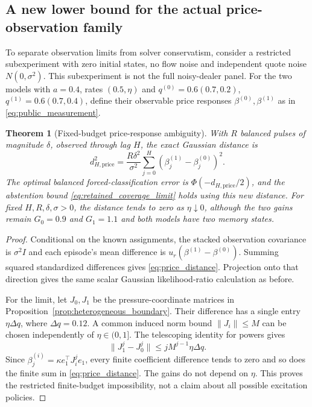 \documentclass[11pt,a4paper]{article}
\newtheorem{theorem}{Theorem}[section]
\theoremstyle{definition}
\theoremstyle{remark}
\begin{document}
\subsection{A new lower bound for the actual price-observation family}
\label{subsec:price_limit}
To separate observation limits from solver conservatism, consider a restricted subexperiment with zero initial states, no flow noise and independent quote noise $N(0,\sigma^2)$. This subexperiment is not the full noisy-dealer panel. For the two models with $a=0.4$, rates $(0.5,\eta)$ and $q^{(0)}=0.6(0.7,0.2)$, $q^{(1)}=0.6(0.7,0.4)$, define their observable price responses $\beta^{(0)},\beta^{(1)}$ as in \eqref{eq:public_measurement}.

\begin{theorem}[Fixed-budget price-response ambiguity]
\label{thm:price_limit}
With $R$ balanced pulses of magnitude $\delta$, observed through lag $H$, the exact Gaussian distance is
\begin{equation}
 d_{H,\mathrm{price}}^2=\frac{R\delta^2}{\sigma^2}
 \sum_{j=0}^{H}(\beta_j^{(1)}-\beta_j^{(0)})^2.
 \label{eq:price_distance}
\end{equation}
The optimal balanced forced-classification error is $\Phi(-d_{H,\mathrm{price}}/2)$, and the abstention bound \eqref{eq:retained_coverage_limit} holds using this new distance. For fixed $H,R,\delta,\sigma>0$, the distance tends to zero as $\eta\downarrow0$, although the two gains remain $G_0=0.9$ and $G_1=1.1$ and both models have two memory states.
\end{theorem}
\begin{proof}
Conditional on the known assignments, the stacked observation covariance is $\sigma^2I$ and each episode's mean difference is $u_r(\beta^{(1)}-\beta^{(0)})$. Summing squared standardized differences gives \eqref{eq:price_distance}. Projection onto that direction gives the same scalar Gaussian likelihood-ratio calculation as before.

For the limit, let $J_0,J_1$ be the pressure-coordinate matrices in Proposition~\ref{prop:heterogeneous_boundary}. Their difference has a single entry $\eta\Delta q$, where $\Delta q=0.12$. A common induced norm bound $\|J_i\|\le M$ can be chosen independently of $\eta\in(0,1]$. The telescoping identity for powers gives
\[
 \|J_1^j-J_0^j\|\le jM^{j-1}\eta\Delta q.
\]
Since $\beta_j^{(i)}=\kappa e_1^\top J_i^je_1$, every finite coefficient difference tends to zero and so does the finite sum in \eqref{eq:price_distance}. The gains do not depend on $\eta$. This proves the restricted finite-budget impossibility, not a claim about all possible excitation policies.
\end{proof}
\end{document}

